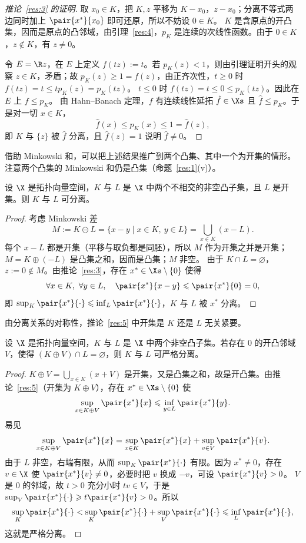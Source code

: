 \begin{proof}[推论~\ref{res:3} 的证明]
取 $x_0\in K$，把 $K,z$ 平移为 $K-x_0$，$z-x_0$；分离不等式两边同时加上 $\pair{x^*}{x_0}$ 即可还原，所以不妨设 $0\in K$。
$K$ 是含原点的开凸集，因而是原点的凸邻域，由引理~\ref{res:4}，$p_K$ 是连续的次线性函数。由于 $0\in K$，$z\notin K$，有 $z\neq0$。

令 $E=\R z$，在 $E$ 上定义 $f(tz):=t$。若 $p_K(z)<1$，则由引理证明开头的观察 $z\in K$，矛盾；故 $p_K(z)\geqslant1=f(z)$，由正齐次性，$t\geqslant0$ 时 $f(tz)=t\leqslant tp_K(z)=p_K(tz)$。
$t\leqslant0$ 时 $f(tz)=t\leqslant0\leqslant p_K(tz)$。因此在 $E$ 上 $f\leqslant p_K$。
由 Hahn--Banach 定理，$f$ 有连续线性延拓 $\hat f\in\Xs$ 且 $\hat f\leqslant p_K$。于是对一切 $x\in K$，
\[
  \hat f(x)\leqslant p_K(x)\leqslant1=\hat f(z),
\]
即 $K$ 与 $\{z\}$ 被 $\hat f$ 分离，且 $\hat f(z)=1$ 说明 $\hat f\neq0$。
\end{proof}

借助 Minkowski 和，可以把上述结果推广到两个凸集、其中一个为开集的情形。注意两个凸集的 Minkowski 和仍是凸集（命题~\ref{res:1}(v)）。

\begin{corollary}
\label{res:5}
设 $\X$ 是拓扑向量空间，$K$ 与 $L$ 是 $\X$ 中两个不相交的非空凸子集，且 $L$ 是开集。则 $K$ 与 $L$ 可分离。
\end{corollary}

\begin{proof}
考虑 Minkowski 差
\[
  M:=K\ominus L=\{x-y\mid x\in K,\ y\in L\}=\bigcup_{x\in K}(x-L).
\]
每个 $x-L$ 都是开集（平移与取负都是同胚），所以 $M$ 作为开集之并是开集；$M=K\oplus(-L)$ 是凸集之和，因而是凸集；$M$ 非空。
由于 $K\cap L=\varnothing$，$z:=0\notin M$。由推论~\ref{res:3}，存在 $x^*\in\Xs\setminus\{0\}$ 使得
\[
  \forall x\in K,\ \forall y\in L,\quad \pair{x^*}{x-y}\leqslant\pair{x^*}{0}=0 ,
\]
即 $\sup_K\pair{x^*}{\cdot}\leqslant\inf_L\pair{x^*}{\cdot}$，$K$ 与 $L$ 被 $x^*$ 分离。
\end{proof}

由分离关系的对称性，推论~\ref{res:5} 中开集是 $K$ 还是 $L$ 无关紧要。

\begin{corollary}
\label{res:6}
设 $\X$ 是拓扑向量空间，$K$ 与 $L$ 是 $\X$ 中两个非空凸子集。若存在 $0$ 的开凸邻域 $V$，使得 $(K\oplus V)\cap L=\varnothing$，则 $K$ 与 $L$ 可严格分离。
\end{corollary}

\begin{proof}
$K\oplus V=\bigcup_{x\in K}(x+V)$ 是开集，又是凸集之和，故是开凸集。由推论~\ref{res:5}（开集为 $K\oplus V$），存在 $x^*\in\Xs\setminus\{0\}$ 使
\[
  \sup_{x\in K\oplus V}\pair{x^*}{x}\leqslant\inf_{y\in L}\pair{x^*}{y}.
\]
易见
\[
  \sup_{x\in K\oplus V}\pair{x^*}{x}=\sup_{x\in K}\pair{x^*}{x}+\sup_{v\in V}\pair{x^*}{v}.
\]
由于 $L$ 非空，右端有限，从而 $\sup_K\pair{x^*}{\cdot}$ 有限。因为 $x^*\neq0$，存在 $v\in\X$ 使 $\pair{x^*}{v}\neq0$，必要时把 $v$ 换成 $-v$，可设 $\pair{x^*}{v}>0$。
$V$ 是 $0$ 的邻域，故 $t>0$ 充分小时 $tv\in V$，于是 $\sup_V\pair{x^*}{\cdot}\geqslant t\pair{x^*}{v}>0$。所以
\[
  \sup_K\pair{x^*}{\cdot}<\sup_K\pair{x^*}{\cdot}+\sup_V\pair{x^*}{\cdot}\leqslant\inf_L\pair{x^*}{\cdot},
\]
这就是严格分离。
\end{proof}

